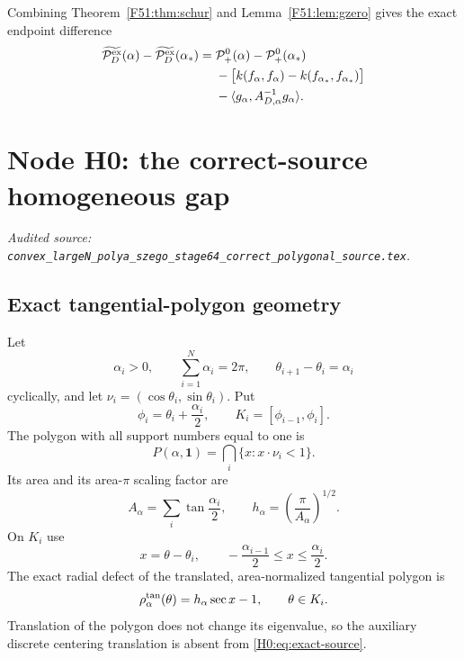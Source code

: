 \documentclass[11pt]{amsart}
\numberwithin{equation}{section}
\theoremstyle{definition}
\theoremstyle{remark}
\newcommand{\Pplus}{\mathcal P_+^0}
\newcommand{\PD}{\mathcal P_D^{\rm ex}}
\begin{document}
Combining Theorem~\ref{F51:thm:schur} and Lemma~\ref{F51:lem:gzero} gives the exact
endpoint difference
\begin{align}\label{F51:eq:endpoint-difference}
 \widetilde{\PD}(\alpha)-\widetilde{\PD}(\alpha_*)
 ={}&\Pplus(\alpha)-\Pplus(\alpha_*)\\
 &-\bigl[k(f_\alpha,f_\alpha)
          -k(f_{\alpha_*},f_{\alpha_*})\bigr]\notag\\
 &-\langle g_\alpha,A_{D,\alpha}^{-1}g_\alpha\rangle.\notag
\end{align}
\endgroup

\begingroup
\section{Node H0: the correct-source homogeneous gap}
\label{module:H0}
\noindent\textit{Audited source: \nolinkurl{convex_largeN_polya_szego_stage64_correct_polygonal_source.tex}.}
\subsection{Exact tangential-polygon geometry}

Let
\begin{equation}\label{H0:eq:fan}
 \alpha_i>0,\qquad \sum_{i=1}^N\alpha_i=2\pi,
 \qquad \theta_{i+1}-\theta_i=\alpha_i
\end{equation}
cyclically, and let
$\nu_i=(\cos\theta_i,\sin\theta_i)$.  Put
\begin{equation}\label{H0:eq:vertices}
 \phi_i=\theta_i+\frac{\alpha_i}{2},
 \qquad K_i=[\phi_{i-1},\phi_i].
\end{equation}
The polygon with all support numbers equal to one is
\begin{equation}
 P(\alpha,\mathbf 1)=\bigcap_i\{x:x\cdot\nu_i<1\}.
\end{equation}
Its area and its area-$\pi$ scaling factor are
\begin{equation}\label{H0:eq:scale}
 A_\alpha=\sum_i\tan\frac{\alpha_i}{2},
 \qquad h_\alpha=\left(\frac{\pi}{A_\alpha}\right)^{1/2}.
\end{equation}
On $K_i$ use
\begin{equation}\label{H0:eq:edge-coordinate}
 x=\theta-\theta_i,
 \qquad -\frac{\alpha_{i-1}}2\le x\le\frac{\alpha_i}2.
\end{equation}
The exact radial defect of the translated, area-normalized tangential
polygon is
\begin{equation}\label{H0:eq:exact-source}
 \rho_\alpha^{\rm tan}(\theta)=h_\alpha\sec x-1,
 \qquad \theta\in K_i.
\end{equation}
Translation of the polygon does not change its eigenvalue, so the auxiliary
discrete centering translation is absent from \eqref{H0:eq:exact-source}.
\end{document}
